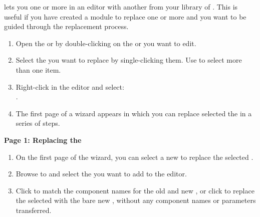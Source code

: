 
\app{} lets you  one or more \gdcases{} in an editor with another \gdcase{} from your library of \gdcases{}. This is useful if you have created a module to replace one or more \gdcases{} and you want to be guided through the replacement process.


\begin{enumerate}
\item Open the \gdtestcaseeditor{} or \gdtestsuiteeditor{} by double-clicking on the \gdcase{} or \gdsuite{} you  want to edit. 
\item Select the \gdcases{} you want to replace by single-clicking them. Use 
   to select more than one item. 
\item Right-click in the editor and  select: \\
.
\item The first page of a wizard appears in which you can replace selected the \gdcases{} in a series of steps. 
\end{enumerate}

\textbf{Page 1: Replacing the \gdcases{}}
\begin{enumerate}
\item On the first page of the wizard, you can select a  new  \gdcase{} to replace the selected \gdcases{}. 
\item Browse to and select the \gdcase{} you want to add to the editor.
\item Click  to match the component names for the old and new \gdcases{}, or click  to replace the selected \gdcases{} with the bare new \gdcase{}, without any component names or parameters transferred. 
\end{enumerate}

